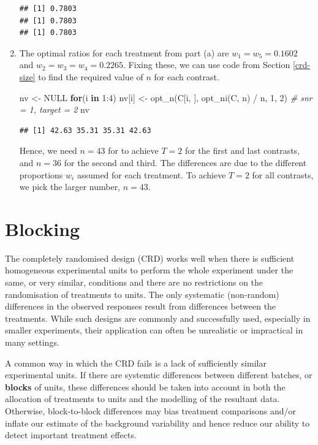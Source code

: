 \documentclass[
]{book}
\newenvironment{Shaded}{\begin{snugshade}}{\end{snugshade}}
\newcommand{\CommentTok}[1]{\textcolor[rgb]{0.56,0.35,0.01}{\textit{#1}}}
\newcommand{\ConstantTok}[1]{\textcolor[rgb]{0.00,0.00,0.00}{#1}}
\newcommand{\ControlFlowTok}[1]{\textcolor[rgb]{0.13,0.29,0.53}{\textbf{#1}}}
\newcommand{\DecValTok}[1]{\textcolor[rgb]{0.00,0.00,0.81}{#1}}
\newcommand{\FunctionTok}[1]{\textcolor[rgb]{0.00,0.00,0.00}{#1}}
\newcommand{\NormalTok}[1]{#1}
\newcommand{\OtherTok}[1]{\textcolor[rgb]{0.56,0.35,0.01}{#1}}
\newcommand{\SpecialCharTok}[1]{\textcolor[rgb]{0.00,0.00,0.00}{#1}}
\theoremstyle{definition}
\theoremstyle{definition}
\theoremstyle{definition}
\theoremstyle{definition}
\theoremstyle{remark}
\begin{document}
\begin{enumerate}
\begin{verbatim}
## [1] 0.7803
## [1] 0.7803
## [1] 0.7803
\end{verbatim}
\item
  The optimal ratios for each treatment from part (a) are \(w_1 = w_5 = 0.1602\) and \(w_2 = w_3 = w_4 = 0.2265\). Fixing these, we can use code from Section \ref{crd-size} to find the required value of \(n\) for each contrast.

\begin{Shaded}
\begin{Highlighting}[]
\NormalTok{nv }\OtherTok{\textless{}{-}} \ConstantTok{NULL}
\ControlFlowTok{for}\NormalTok{(i }\ControlFlowTok{in} \DecValTok{1}\SpecialCharTok{:}\DecValTok{4}\NormalTok{) nv[i] }\OtherTok{\textless{}{-}} \FunctionTok{opt\_n}\NormalTok{(C[i, ], }\FunctionTok{opt\_ni}\NormalTok{(C, n) }\SpecialCharTok{/}\NormalTok{ n, }\DecValTok{1}\NormalTok{, }\DecValTok{2}\NormalTok{) }\CommentTok{\# snr = 1, target = 2}
\NormalTok{nv}
\end{Highlighting}
\end{Shaded}

\begin{verbatim}
## [1] 42.63 35.31 35.31 42.63
\end{verbatim}

  Hence, we need \(n = 43\) for to achieve \(T = 2\) for the first and last contrasts, and \(n = 36\) for the second and third. The differences are due to the different proportions \(w_i\) assumed for each treatment. To achieve \(T=2\) for all contrasts, we pick the larger number, \(n = 43\).
\end{enumerate}

\hypertarget{blocking}{%
\chapter{Blocking}\label{blocking}}

The completely randomised design (CRD) works well when there is sufficient homogeneous experimental units to perform the whole experiment under the same, or very similar, conditions and there are no restrictions on the randomisation of treatments to units. The only systematic (non-random) differences in the observed responses result from differences between the treatments. While such designs are commonly and successfully used, especially in smaller experiments, their application can often be unrealistic or impractical in many settings.

A common way in which the CRD fails is a lack of sufficiently similar experimental units. If there are systemtic differences between different batches, or \textbf{blocks} of units, these differences should be taken into account in both the allocation of treatments to units and the modelling of the resultant data. Otherwise, block-to-block differences may bias treatment comparisons and/or inflate our estimate of the background variability and hence reduce our ability to detect important treatment effects.
\end{document}
